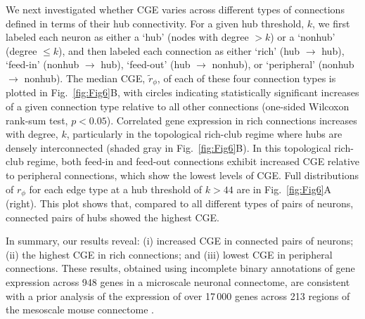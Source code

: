 \documentclass[10pt,letterpaper]{article}
\begin{document}
We next investigated whether CGE varies across different types of connections defined in terms of their hub connectivity.
For a given hub threshold, $k$, we first labeled each neuron as either a `hub' (nodes with degree $> k$) or a `nonhub' (degree $\leq k$), and then labeled each connection as either `rich' (hub $\rightarrow$ hub), `feed-in' (nonhub $\rightarrow$ hub), `feed-out' (hub $\rightarrow$ nonhub), or `peripheral' (nonhub $\rightarrow$ nonhub).
The median CGE, $\tilde{r}_\phi$, of each of these four connection types is plotted in Fig.~\ref{fig:Fig6}B, with circles indicating statistically significant increases of a given connection type relative to all other connections (one-sided Wilcoxon rank-sum test, $p < 0.05$).
Correlated gene expression in rich connections increases with degree, $k$, particularly in the topological rich-club regime where hubs are densely interconnected (shaded gray in Fig.~\ref{fig:Fig6}B).
In this topological rich-club regime, both feed-in and feed-out connections exhibit increased CGE relative to peripheral connections, which show the lowest levels of CGE.
Full distributions of $r_\phi$ for each edge type at a hub threshold of $k > 44$ are in Fig.~\ref{fig:Fig6}A (right).
This plot shows that, compared to all different types of pairs of neurons, connected pairs of hubs showed the highest CGE.

In summary, our results reveal:
(i) increased CGE in connected pairs of neurons;
(ii) the highest CGE in rich connections; and
(iii) lowest CGE in peripheral connections.
These results, obtained using incomplete binary annotations of gene expression across 948 genes in a microscale neuronal connectome, are consistent with a prior analysis of the expression of over 17\,000 genes across 213 regions of the mesoscale mouse connectome \cite{Fulcher:2016ck}.
\end{document}
